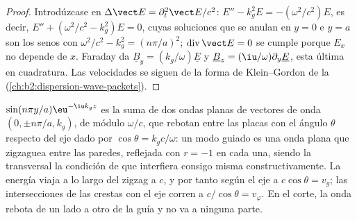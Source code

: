 \begin{proof}
Introdúzcase en $\Delta\vect E = \partial_t^2\vect E/c^2$: $E'' - k_g^2E = -(\omega^2/c^2)E$, es decir,
$E'' + (\omega^2/c^2 - k_g^2)E = 0$, cuyas soluciones que se anulan en $y = 0$ e
$y = a$ son los senos con $\omega^2/c^2 - k_g^2 = (n\pi/a)^2$; $\operatorname{div}
\vect E = 0$ se cumple porque $E_x$ no depende de $x$. Faraday da
$\underline B_y = (k_g/\omega)\underline E$ y $\underline B_z = (\iu/\omega)\partial_y\underline E$, esta última
en cuadratura. Las velocidades se siguen de la forma de Klein--Gordon de
la  (\cref{ch:b2:dispersion-wave-packets}).
\end{proof}

\begin{remark}\label{rem:b2:guided-waves:zigzag}
$\sin(n\pi y/a)\eu^{-\iu k_gz}$ es la suma de dos ondas planas de
vectores de onda $(0, \pm n\pi/a, k_g)$, de módulo $\omega/c$, que rebotan entre
las placas con el ángulo $\theta$ respecto del eje dado por $\cos\theta = k_gc/\omega$:
un modo guiado es una onda plana que zigzaguea entre las paredes, reflejada
con $r = -1$ en cada una, siendo la  transversal la
condición de que interfiera consigo misma constructivamente. La energía
viaja a lo largo del zigzag a $c$, y por tanto según el eje a $c\cos\theta = v_g$;
las intersecciones de las crestas con el eje corren a $c/\cos\theta = v_\varphi$. En
el corte, la onda rebota de un lado a otro de la guía y no va a
ninguna parte.
\end{remark}

